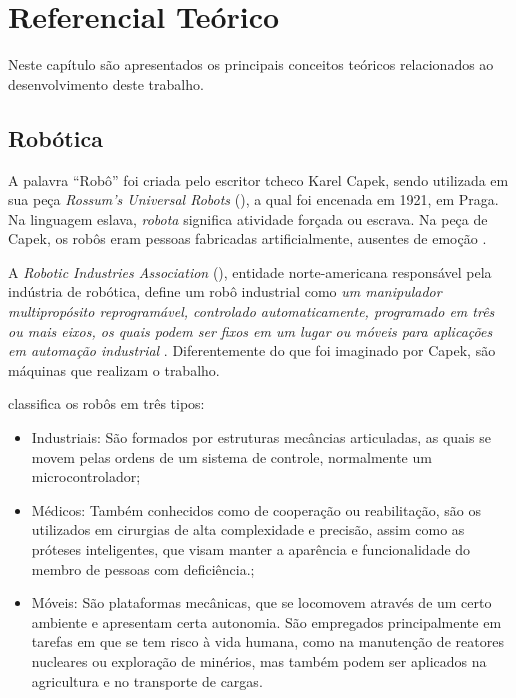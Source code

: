 
\chapter{Referencial Teórico} \label{cap:funda}

\vspace{-1cm} %

Neste capítulo são apresentados os principais conceitos teóricos relacionados ao desenvolvimento deste trabalho.


\vspace{1cm}
\section{Robótica} \label{cap:rob_auto}
A palavra ``Robô'' foi criada pelo escritor tcheco Karel Capek, sendo utilizada em sua peça 
\textit{Rossum's Universal Robots} (), a qual foi 
encenada em 1921, em Praga. Na linguagem eslava, \textit{robota} significa atividade 
forçada ou escrava. Na peça de Capek, os robôs eram pessoas fabricadas artificialmente, ausentes
de emoção \cite{polonskii1996}.\par
A \textit{Robotic Industries Association} (), 
entidade norte-americana responsável pela indústria de robótica, define um robô industrial como
 \textit{um manipulador multipropósito reprogramável, controlado automaticamente, programado em três 
 ou mais eixos, os quais podem ser fixos em um lugar ou móveis para aplicações em automação industrial} \cite{RIAdef}.
Diferentemente do que foi imaginado por Capek, são máquinas que realizam o trabalho.

 classifica os robôs em três tipos:
\begin{itemize}
 \item Industriais: São formados por estruturas mecâncias articuladas, as quais se movem pelas ordens de um sistema de 
 controle, normalmente um microcontrolador;
 \item Médicos: Também conhecidos como de cooperação ou reabilitação, são os utilizados em cirurgias de alta complexidade e 
 precisão, assim como as próteses inteligentes, que visam manter a aparência e funcionalidade do membro de pessoas com 
 deficiência.;
 \item Móveis: São plataformas mecânicas, que se locomovem através de um certo ambiente e apresentam certa autonomia.
São empregados principalmente em tarefas em que se tem risco à vida humana, como na manutenção de reatores nucleares ou 
exploração de 
minérios, mas também podem ser aplicados na agricultura e no transporte de cargas.
\end{itemize}


